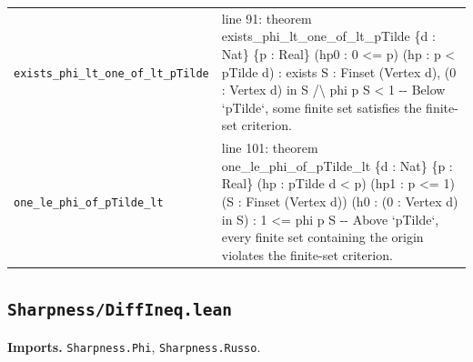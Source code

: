 \documentclass[10pt]{article}
\newcommand{\module}[1]{\texttt{#1}}
\begin{document}
\begin{longtable}{>{\raggedright\arraybackslash}p{} >{\raggedright\arraybackslash}p{}}
\texttt{exists\_\allowbreak{}phi\_\allowbreak{}lt\_\allowbreak{}one\_\allowbreak{}of\_\allowbreak{}lt\_\allowbreak{}pTilde} & {\ttfamily\scriptsize line 91:\allowbreak{} theorem exists\_\allowbreak{}phi\_\allowbreak{}lt\_\allowbreak{}one\_\allowbreak{}of\_\allowbreak{}lt\_\allowbreak{}pTilde \{d :\allowbreak{} Nat\} \{p :\allowbreak{} Real\} (\allowbreak{}hp0 :\allowbreak{} 0 <=\allowbreak{} p)\allowbreak{} (\allowbreak{}hp :\allowbreak{} p < pTilde d)\allowbreak{} :\allowbreak{} exists S :\allowbreak{} Finset (\allowbreak{}Vertex d)\allowbreak{},\allowbreak{} (\allowbreak{}0 :\allowbreak{} Vertex d)\allowbreak{} in S /\allowbreak{}\textbackslash{} phi p S < 1 -\allowbreak{}-\allowbreak{} Below `pTilde`,\allowbreak{} some finite set satisfies the finite-\allowbreak{}set criterion.\allowbreak{}} \\[0.45em]
\texttt{one\_\allowbreak{}le\_\allowbreak{}phi\_\allowbreak{}of\_\allowbreak{}pTilde\_\allowbreak{}lt} & {\ttfamily\scriptsize line 101:\allowbreak{} theorem one\_\allowbreak{}le\_\allowbreak{}phi\_\allowbreak{}of\_\allowbreak{}pTilde\_\allowbreak{}lt \{d :\allowbreak{} Nat\} \{p :\allowbreak{} Real\} (\allowbreak{}hp :\allowbreak{} pTilde d < p)\allowbreak{} (\allowbreak{}hp1 :\allowbreak{} p <=\allowbreak{} 1)\allowbreak{} (\allowbreak{}S :\allowbreak{} Finset (\allowbreak{}Vertex d)\allowbreak{})\allowbreak{} (\allowbreak{}h0 :\allowbreak{} (\allowbreak{}0 :\allowbreak{} Vertex d)\allowbreak{} in S)\allowbreak{} :\allowbreak{} 1 <=\allowbreak{} phi p S -\allowbreak{}-\allowbreak{} Above `pTilde`,\allowbreak{} every finite set containing the origin violates the finite-\allowbreak{}set criterion.\allowbreak{}} \\[0.45em]
\end{longtable}

\subsection*{\module{Sharpness/DiffIneq.lean}}
\textbf{Imports.} \module{Sharpness.Phi}, \module{Sharpness.Russo}.
\end{document}
